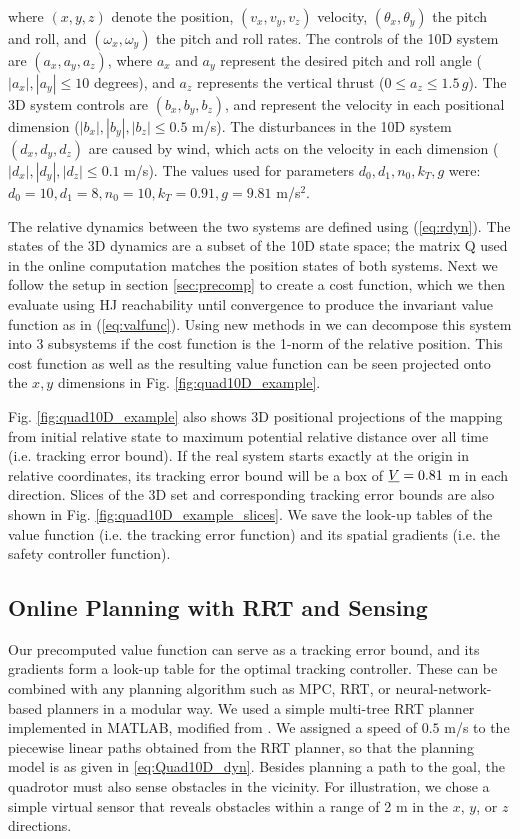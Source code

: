 where $(x, y, z)$ denote the position, $(v_x, v_y, v_z)$ velocity, $(\theta_x, \theta_y)$ the pitch and roll, and $(\omega_x, \omega_y)$ the pitch and roll rates. The controls of the 10D system are $(a_x, a_y, a_z)$, where $a_x$ and $a_y$ represent the desired pitch and roll angle ($|a_x|,|a_y|\leq10$ degrees), and $a_z$ represents the vertical thrust ($0\leq a_z\leq 1.5\,g$). The 3D system controls are $(b_x, b_y, b_z)$, and represent the velocity in each positional dimension ($|b_x|,|b_y|,|b_z|\leq0.5$ m/s). The disturbances in the 10D system $(d_x, d_y, d_z)$ are caused by wind, which acts on the velocity in each dimension ($|d_x|,|d_y|,|d_z|\leq0.1$ m/s). The values used for parameters $d_0,d_1,n_0,k_T,g$ were: $d_0=10,d_1=8,n_0=10,k_T=0.91,g=9.81$ m/s$^2$.

The relative dynamics between the two systems are defined using (\ref{eq:rdyn}). The states of the 3D dynamics are a subset of the 10D state space; the matrix Q used in the online computation matches the position states of both systems. Next we follow the setup in section \ref{sec:precomp} to create a cost function, which we then evaluate using HJ reachability until convergence to produce the invariant value function as in (\ref{eq:valfunc}). Using new methods in \cite{Chen2016DecouplingExact, Chen2016DecouplingJournal} we can decompose this system into 3 subsystems if the cost function is the 1-norm of the relative position. This cost function as well as the resulting value function can be seen projected onto the $x,y$ dimensions in Fig. \ref{fig:quad10D_example}.

Fig. \ref{fig:quad10D_example} also shows 3D positional projections of the mapping from initial relative state to maximum potential relative distance over all time (i.e. tracking error bound). If the real system starts exactly at the origin in relative coordinates, its tracking error bound will be a box of $\underline{V} = 0.81$ m in each direction. Slices of the 3D set and corresponding tracking error bounds are also shown in Fig. \ref{fig:quad10D_example_slices}. We save the look-up tables of the value function (i.e. the tracking error function) and its spatial gradients (i.e. the safety controller function).

\subsection{Online Planning with RRT and Sensing}
Our precomputed value function can serve as a tracking error bound, and its gradients form a look-up table for the optimal tracking controller. These can be combined with any planning algorithm such as MPC, RRT, or neural-network-based planners in a modular way. We used a simple multi-tree RRT planner implemented in MATLAB, modified from \cite{Gavin2013}. We assigned a speed of $0.5$ m/s to the piecewise linear paths obtained from the RRT planner, so that the planning model is as given in \eqref{eq:Quad10D_dyn}. Besides planning a path to the goal, the quadrotor must also sense obstacles in the vicinity. For illustration, we chose a simple virtual sensor that reveals obstacles within a range of 2 m in the $x$, $y$, or $z$ directions.


